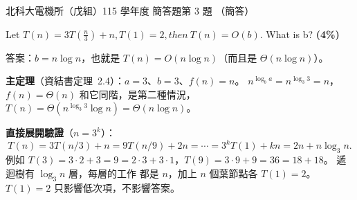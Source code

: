 \begin{pastexam}[label={px:ntut-115-ee-ds-18}]{北科大電機所（戊組）115 學年度 簡答題第 3 題}
（簡答）

Let $T(n) = 3T\left(\frac{n}{3}\right) + n, T(1) = 2, then\ T(n) = O(b)$. What is b? \textbf{(4\%)}
\end{pastexam}

\begin{pastsoln}
答案：$b = n \log n$，也就是 $T(n) = O(n \log n)$（而且是 $\Theta(n \log n)$）。

\textbf{主定理}（資結書定理~2.4）：$a = 3$、$b = 3$、$f(n) = n$。 $n^{\log_b a} = n^{\log_3 3} = n$，$f(n) = \Theta(n)$
和它同階，是第二種情況，$T(n) = \Theta(n^{\log_3 3} \log n) = \Theta(n \log n)$。

\textbf{直接展開驗證}（$n = 3^k$）：
\[
T(n) = 3T(n/3) + n = 9T(n/9) + 2n = \cdots = 3^k T(1) + kn = 2n + n \log_3 n .
\]
例如 $T(3) = 3 \cdot 2 + 3 = 9 = 2 \cdot 3 + 3 \cdot 1$，$T(9) = 3 \cdot 9 + 9 = 36 = 18 + 18$。 遞迴樹有 $\log_3 n$ 層，每層的工作
都是 $n$，加上 $n$ 個葉節點各 $T(1) = 2$。 $T(1) = 2$ 只影響低次項，不影響答案。
\end{pastsoln}

